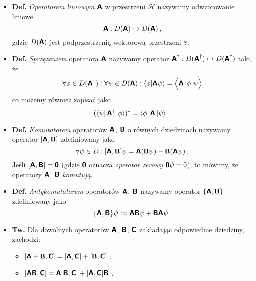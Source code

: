 \documentclass{myclass}
\begin{document}
\begin{itemize}
    
    \item \textbf{Def.} \textit{Operatorem liniowym} \(\boldsymbol{\mathsf{A}}\) w przestrzeni \(\mathscr{H}\)
    nazywamy odwzorowanie liniowe 
    \begin{equation*}
        \boldsymbol{\mathsf{A}} : D(\boldsymbol{\mathsf{A}}) \mapsto D(\boldsymbol{\mathsf{A}})\,,
    \end{equation*}
     gdzie \(D(\boldsymbol{\mathsf{A}})\) jest podprzestrzenią wektorową przestrzeni \(\mathbb{V}\).

    \item \textbf{Def.} \textit{Sprzężeniem} operatora \(\boldsymbol{\mathsf{A}}\) nazywamy operator
    \(\boldsymbol{\mathsf{A}}^\dagger : D(\boldsymbol{\mathsf{A}}^\dagger) \mapsto D(\boldsymbol{\mathsf{A}}^\dagger)\) taki, że 
    \begin{equation*}
        \forall \phi \in D(\boldsymbol{\mathsf{A}}^\dagger) : \forall \psi \in D(\boldsymbol{\mathsf{A}}) : \braket{\phi}{\boldsymbol{\mathsf{A}}\psi} = \braket{\boldsymbol{\mathsf{A}}^\dagger\phi}{\psi}
    \end{equation*}
    co możemy również zapisać jako
    \begin{equation*}
        (\bra{\psi}\boldsymbol{\mathsf{A}}^\dagger\ket{\phi})^* = \bra{\phi}\boldsymbol{\mathsf{A}}\ket{\psi}\,.
    \end{equation*}

    \item \textbf{Def.} \textit{Komutatorem} operatorów \(\boldsymbol{\mathsf{A}}\), \(\boldsymbol{\mathsf{B}}\) o równych
    dziedzinach nazywamy operator \([\boldsymbol{\mathsf{A}},\boldsymbol{\mathsf{B}}]\) zdefiniowany jako
    \begin{equation*}
        \forall \psi \in D : [\boldsymbol{\mathsf{A}},\boldsymbol{\mathsf{B}}]\psi = \boldsymbol{\mathsf{A}}(\boldsymbol{\mathsf{B}}\psi) - \boldsymbol{\mathsf{B}}(\boldsymbol{\mathsf{A}}\psi)\,. 
    \end{equation*}
    Jeśli \([\boldsymbol{\mathsf{A}},\boldsymbol{\mathsf{B}}] = \boldsymbol{\mathsf{\mathsf{0}}}\) (gdzie \(\boldsymbol{\mathsf{\mathsf{0}}}\) oznacza
    \textit{operator zerowy} \(\boldsymbol{\mathsf{\mathsf{0}}}\psi=\mathsf{0}\)), to mówimy, że operatory
    \(\boldsymbol{\mathsf{A}}\), \(\boldsymbol{\mathsf{B}}\) \textit{komutują}.
    
    \item \textbf{Def.} \textit{Antykomutatorem} operatorów \(\boldsymbol{\mathsf{A}}\), \(\boldsymbol{\mathsf{B}}\) nazywamy
    operator \(\{\boldsymbol{\mathsf{A}},\boldsymbol{\mathsf{B}}\}\) zdefiniowany jako
    \begin{equation*}
        \{\boldsymbol{\mathsf{A}},\boldsymbol{\mathsf{B}}\}\psi := \boldsymbol{\mathsf{A}}\boldsymbol{\mathsf{B}}\psi + \boldsymbol{\mathsf{B}}\boldsymbol{\mathsf{A}}\psi\,.
    \end{equation*}

    \item \textbf{Tw.} Dla dowolnych operatorów \(\boldsymbol{\mathsf{A}}\), \(\boldsymbol{\mathsf{B}}\), \(\boldsymbol{\mathsf{C}}\) zakładając
    odpowiednie dziedziny, zachodzi:
    \begin{itemize}
        \item \([\boldsymbol{\mathsf{A}} + \boldsymbol{\mathsf{B}},\boldsymbol{\mathsf{C}}] = [\boldsymbol{\mathsf{A}},\boldsymbol{\mathsf{C}}] + [\boldsymbol{\mathsf{B}},\boldsymbol{\mathsf{C}}]\) ;
        \item \([\boldsymbol{\mathsf{A}}\boldsymbol{\mathsf{B}},\boldsymbol{\mathsf{C}}] = \boldsymbol{\mathsf{A}}[\boldsymbol{\mathsf{B}},\boldsymbol{\mathsf{C}}] +
        [\boldsymbol{\mathsf{A}},\boldsymbol{\mathsf{C}}]\boldsymbol{\mathsf{B}}\) .
    \end{itemize}


\end{itemize}
\end{document}
